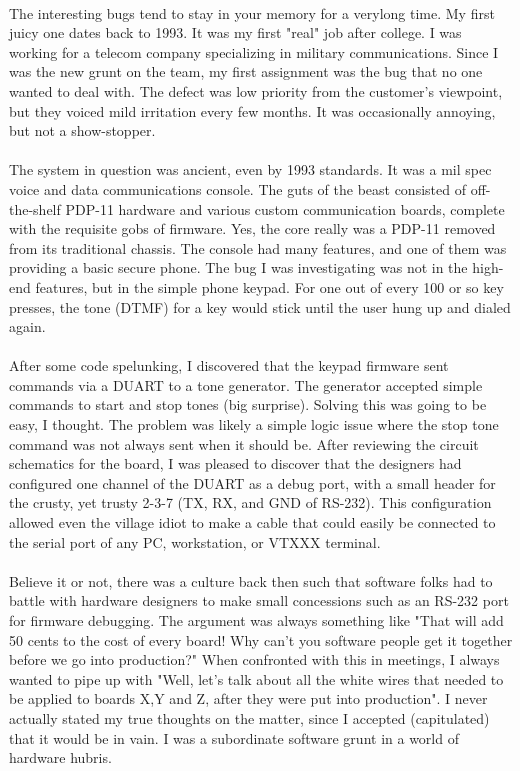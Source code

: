 \paragraph{}
The interesting bugs tend to stay in your memory for a verylong time. My first
juicy one dates back to 1993. It was my first "real" job after college. I was
working for a telecom company specializing in military communications. Since I
was the new grunt on the team, my first assignment was the bug that no one
wanted to deal with. The defect was low priority from the customer's viewpoint,
but they voiced mild irritation every few months. It was occasionally annoying,
but not a show-stopper.

\paragraph{}
The system in question was ancient, even by 1993 standards. It was a mil spec
voice and data communications console. The guts of the beast consisted of
off-the-shelf PDP-11 hardware and various custom communication boards, complete
with the requisite gobs of firmware. Yes, the core really was a PDP-11 removed
from its traditional chassis. The console had many features, and one of them was
providing a basic secure phone. The bug I was investigating was not in the
high-end features, but in the simple phone keypad. For one out of every 100 or
so key presses, the tone (DTMF) for a key would stick until the user hung up and
dialed again.
\paragraph {}
After some code spelunking, I discovered that the keypad firmware sent commands
via a DUART to a tone generator. The generator accepted simple commands to start
and stop tones (big surprise). Solving this was going to be easy, I thought. The
problem was likely a simple logic issue where the stop tone command was not
always sent when it should be. After reviewing the circuit schematics for the
board, I was pleased to discover that the designers had configured one channel
of the DUART as a debug port, with a small header for the crusty, yet trusty
2-3-7 (TX, RX, and GND of RS-232). This configuration allowed even the village
idiot to make a cable that could easily be connected to the serial port of any
PC, workstation, or VTXXX terminal.
\paragraph {}
Believe it or not, there was a culture back then such that software folks had to
battle with hardware designers to make small concessions such as an RS-232 port
for firmware debugging. The argument was always something like "That will add 50
cents to the cost of every board! Why can't you software people get it together
before we go into production?" When confronted with this in meetings, I always
wanted to pipe up with "Well, let's talk about all the white wires that needed
to be applied to boards X,Y and Z, after they were put into production". I never
actually stated my true thoughts on the matter, since I accepted (capitulated)
that it would be in vain. I was a subordinate software grunt in a world of
hardware hubris.
